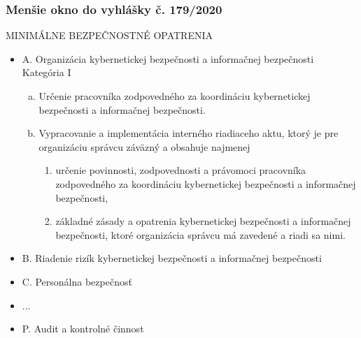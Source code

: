 \documentclass{beamer}
\begin{document}
\begin{frame}
    \frametitle{Menšie okno do vyhlášky č. 179/2020}
    MINIMÁLNE BEZPEČNOSTNÉ OPATRENIA
    \begin{itemize}
        \item A. Organizácia kybernetickej bezpečnosti a informačnej bezpečnosti \\
            Kategória I
            \begin{enumerate}[a)]
                \item Určenie pracovníka zodpovedného za koordináciu kybernetickej bezpečnosti a informačnej bezpečnosti.
                \item Vypracovanie a implementácia interného riadiaceho aktu, ktorý je pre organizáciu správcu záväzný a obsahuje najmenej
                    \begin{enumerate}[1.]
                        \item určenie povinnosti, zodpovednosti a právomoci pracovníka zodpovedného za koordináciu kybernetickej bezpečnosti a informačnej bezpečnosti,
                        \item základné zásady a opatrenia kybernetickej bezpečnosti a informačnej bezpečnosti, ktoré organizácia správcu má zavedené a riadi sa nimi.
                    \end{enumerate}
            \end{enumerate}
        \item B. Riadenie rizík kybernetickej bezpečnosti a informačnej bezpečnosti
        \item C. Personálna bezpečnosť
        \item ...
        \item P. Audit a kontrolné činnost
    \end{itemize}
\end{frame}
\end{document}
